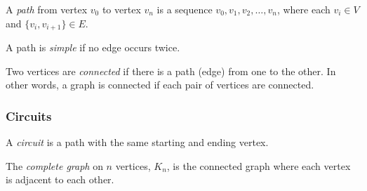 \documentclass{article}
\begin{document}
            \begin{definition}
                A \textit{path} from vertex $v_0$ to vertex $v_n$ is a sequence $v_0, v_1, v_2, \dots, v_n$, where each $v_i\in V$ and $\{v_i,v_{i+1}\} \in E$. 
            \end{definition}
    
            \begin{definition}
                A path is \textit{simple} if no edge occurs twice.
            \end{definition}
    
            \begin{definition}
                 Two vertices are \textit{connected} if there is a path (edge) from one to the other. In other words, a graph is connected if each pair of vertices are connected.
            \end{definition}

\newpage

        \subsubsection{Circuits}

            \begin{definition}
                A \textit{circuit} is a path with the same starting and ending vertex.
            \end{definition}
    
            \begin{definition}
                The \textit{complete graph} on $n$ vertices, $K_n$, is the connected graph where each vertex is adjacent to each other.
            \end{definition}
    
            \vspace{1.0cm}
    
\end{document}
